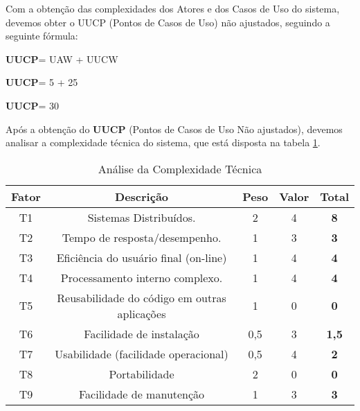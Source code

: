 		Com a obtenção das complexidades dos Atores e dos Casos de Uso do sistema, devemos obter o UUCP (Pontos de Casos de Uso) não ajustados, seguindo a seguinte fórmula:

	\begin{center}

		\textbf{UUCP}= UAW + UUCW

		\textbf{UUCP}= 5 + 25

		\textbf{UUCP}= 30
	\end{center}

	Após a obtenção do \textbf{UUCP} (Pontos de Casos de Uso Não ajustados), devemos analisar a complexidade técnica do sistema, que está disposta na tabela \ref{tab:compTecnica}.

	\begin{table}[H]
		\centering
		\caption{Análise da Complexidade Técnica}
		\label{tab:compTecnica}
		\begin{tabular}{|c|c|c|c|c|}
			\hline
			\textbf{Fator} & \textbf{Descrição}                           & \textbf{Peso} & \textbf{Valor} & \textbf{Total} \\ \hline
			T1             & Sistemas Distribuídos.                       & 2             & 4              & \textbf{8}     \\ \hline
			T2             & Tempo de resposta/desempenho.                & 1             & 3              & \textbf{3}     \\ \hline
			T3             & Eficiência do usuário final (on-line)        & 1             & 4              & \textbf{4}     \\ \hline
			T4             & Processamento interno complexo.              & 1             & 4              & \textbf{4}     \\ \hline
			T5             & Reusabilidade do código em outras aplicações & 1             & 0              & \textbf{0}     \\ \hline
			T6             & Facilidade de instalação                     & 0,5           & 3              & \textbf{1,5}   \\ \hline
			T7             & Usabilidade (facilidade operacional)         & 0,5           & 4              & \textbf{2}     \\ \hline
			T8             & Portabilidade                                & 2             & 0              & \textbf{0}     \\ \hline
			T9             & Facilidade de manutenção                     & 1             & 3              & \textbf{3}     \\ \hline

\end{tabular}
\end{table}
